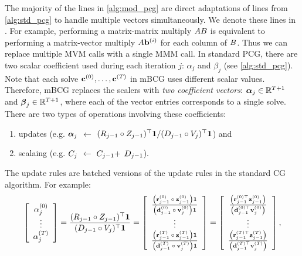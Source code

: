 The majority of the lines in \cref{alg:mod_pcg} are direct adaptations of lines from \cref{alg:std_pcg} to handle multiple vectors simultaneously.
We denote these lines in {\color{\colormat} }.
For example, performing a matrix-matrix multiply $A B$ is equivalent to performing a matrix-vector multiply $A \mathbf{b}^{(i)}$ for each column of $B$.
Thus we can replace multiple MVM calls with a single MMM call.
In standard PCG, there are two scalar coefficient used during each iteration $j$: $\alpha_j$ and $\beta_j$ (see \cref{alg:std_pcg}).
Note that each solve $\mathbf{c}^{(0)}, \ldots, \mathbf{c}^{(T)}$ in mBCG uses different scalar values.
Therefore, mBCG replaces the scalers with \emph{two coefficient vectors}: $\boldsymbol{\alpha}_j \in \mathbb{R}^{T+1}$ and $\boldsymbol{\beta}_j \in \mathbb{R}^{T+1}$, where each of the vector entries corresponds to a single solve.
There are two types of operations involving these coefficients:
%
\begin{enumerate}
  \item updates (e.g. {\color{\colormat} $\boldsymbol{\alpha}_j$ $\gets$ ${( R_{j-1} \circ Z_{j-1} )^\top \mathbf 1}/{( D_{j-1} \circ V_{j} )^\top \mathbf 1}$}) and
  \item scalaing (e.g. {\color{\colormat} $C_j$ $\gets$ $C_{j-1} +$  $D_{j-1}$}).
\end{enumerate}
%
The update rules are batched versions of the update rules in the standard CG algorithm.
For example:
%
\begin{equation*}
  \left[ \begin{array}{c}
    \alpha_j^{(0)}
    \\
    \vdots
    \\
    \alpha_j^{(T)}
  \end{array} \right]
  = \frac{( R_{j-1} \circ Z_{j-1} )^\top \mathbf 1}{( D_{j-1} \circ V_{j} )^\top \mathbf 1}
  = \left[ \begin{array}{c}
      \frac{\left( \mathbf{r}_{j-1}^{(0)} \: \circ \: \mathbf{z}_{j-1}^{(0)} \right) \mathbf 1}
        {\left( \mathbf{d}_{j-1}^{(0)} \: \circ \: \mathbf{v}_{j}^{(0)} \right) \mathbf 1}
        \\
        \vdots
        \\
        \frac{\left( \mathbf{r}_{j-1}^{(T)} \: \circ \: \mathbf{z}_{j-1}^{(T)} \right) \mathbf 1}
        {\left( \mathbf{d}_{j-1}^{(T)} \: \circ \: \mathbf{v}_{j}^{(T)} \right) \mathbf 1}
     \end{array} \right]
  = \left[ \begin{array}{c}
      \frac{\left( \mathbf{r}_{j-1}^{(0)\top} \mathbf{z}_{j-1}^{(0)} \right)}
        {\left( \mathbf{d}_{j-1}^{(0)\top} \mathbf{v}_{j}^{(0)} \right)}
        \\
        \vdots
        \\
        \frac{\left( \mathbf{r}_{j-1}^{(T)\top} \mathbf{z}_{j-1}^{(T)} \right)}
        {\left( \mathbf{d}_{j-1}^{(T)\top} \mathbf{v}_{j}^{(T)} \right)}
     \end{array} \right],
\end{equation*}
